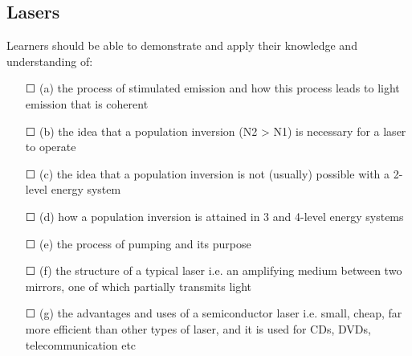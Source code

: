 \subsection{Lasers}Learners should be able to demonstrate and apply their knowledge and
understanding of:
\begin{itemize}
	\item[\Large{$\Square$}] (a) the process of stimulated emission and \sq how this process leads to light emission that is coherent
	\item[\Large{$\Square$}]	(b) the idea that a population inversion (N2 > N1) is necessary for a laser to operate
	\item[\Large{$\Square$}]	(c) the idea that a population inversion is not (usually) possible with a 2-level energy system
	\item[\Large{$\Square$}]	(d) how a population inversion is attained in 3 and 4-level energy systems
	\item[\Large{$\Square$}]	(e) the process of pumping and its purpose
	\item[\Large{$\Square$}]	(f) the structure of a typical laser i.e. an amplifying medium between two mirrors, one of which partially transmits light
	\item[\Large{$\Square$}]	(g) the advantages and uses of a semiconductor laser i.e. small, cheap, far more	efficient than other types of laser, and it is used for CDs, DVDs, telecommunication etc
\end{itemize}
